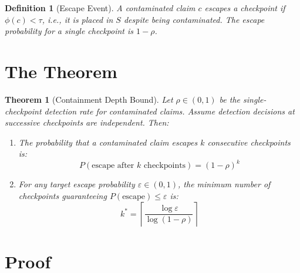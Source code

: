 \documentclass[12pt,a4paper]{article}
\newtheorem{theorem}{Theorem}
\newtheorem{definition}{Definition}
\begin{document}
\begin{definition}[Escape Event]
A contaminated claim $c$ escapes a checkpoint if $\phi(c) < \tau$, i.e., it is placed in $S$ despite being contaminated. The escape probability for a single checkpoint is $1 - \rho$.
\end{definition}

\section{The Theorem}

\begin{theorem}[Containment Depth Bound]
\label{thm:main}
Let $\rho \in (0,1)$ be the single-checkpoint detection rate for contaminated claims. Assume detection decisions at successive checkpoints are independent. Then:

\begin{enumerate}
    \item[(i)] The probability that a contaminated claim escapes $k$ consecutive checkpoints is:
    \[
    P(\text{escape after } k \text{ checkpoints}) = (1 - \rho)^k
    \]
    
    \item[(ii)] For any target escape probability $\varepsilon \in (0,1)$, the minimum number of checkpoints guaranteeing $P(\text{escape}) \leq \varepsilon$ is:
    \[
    k^* = \left\lceil \frac{\log \varepsilon}{\log(1-\rho)} \right\rceil
    \]
\end{enumerate}
\end{theorem}

\section{Proof}
\end{document}
